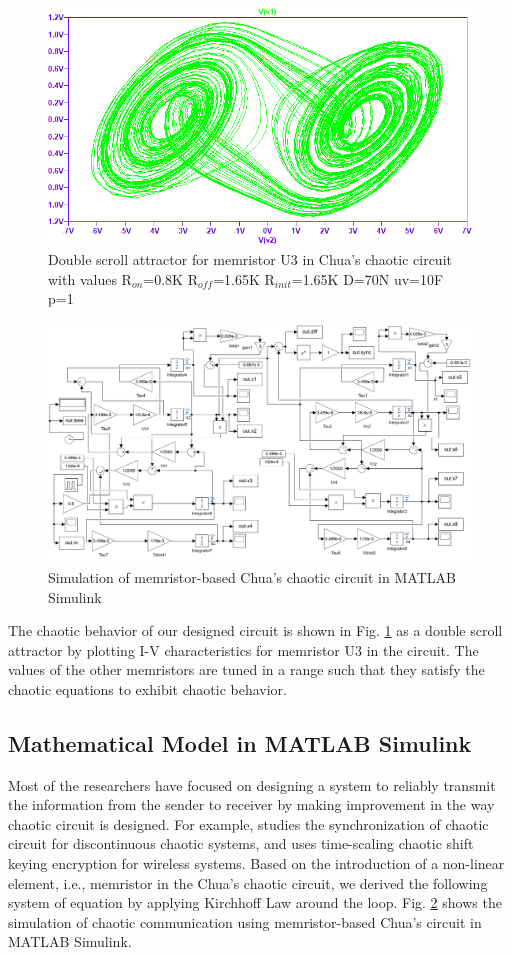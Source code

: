 \begin{figure}[!t]
    \centering
    \includegraphics[width = 0.5\linewidth]{figs/Fig7double_scroll_attractor.PNG}
    \caption{Double scroll attractor for memristor U3 in Chua's chaotic circuit with values R$_{on}$=0.8K R$_{off}$=1.65K R$_{init}$=1.65K D=70N uv=10F p=1}
    \label{fig:4}
\end{figure}

\begin{figure}[]
    \centering
    \includegraphics[width = 1\linewidth]{figs/Fig8output_simulink.PNG}
    \caption{Simulation of memristor-based Chua's chaotic circuit in MATLAB Simulink}
     \label{fig:5}
\end{figure}

The chaotic behavior of our designed circuit is shown in Fig. \ref{fig:4} as a double scroll attractor by plotting I-V characteristics for memristor U3 in the circuit. The values of the other memristors are tuned in a range such that they satisfy the chaotic equations to exhibit chaotic behavior.


\subsection*{Mathematical Model in MATLAB Simulink}
Most of the researchers have focused on designing a system to reliably transmit the information from the sender to receiver \cite{guo2022novel} by making improvement in the way chaotic circuit is designed. For example, \cite{yang2014exponential} studies the synchronization of chaotic circuit for discontinuous chaotic systems, and \cite{9630142} uses time-scaling chaotic shift keying encryption for wireless systems. Based on the introduction of a non-linear element, i.e., memristor in the Chua's chaotic circuit, we derived the following system of equation by applying Kirchhoff Law around the loop. Fig. \ref{fig:5} shows the simulation of chaotic communication using memristor-based Chua's circuit in MATLAB Simulink.
 
